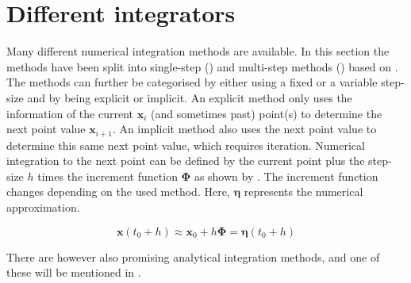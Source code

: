 
\section{Different integrators}
\label{sec:difint}
Many different numerical integration methods are available. In this section the methods have been split into single-step () and multi-step methods () based on \cite{noomen2013int}. The methods can further be categorised by either using a fixed or a variable step-size and by being explicit or implicit. An explicit method only uses the information of the current $\mathbf{x}_{i}$ (and sometimes past) point(s) to determine the next point value $\mathbf{x}_{i+1}$. An implicit method also uses the next point value to determine this same next point value, which requires iteration. Numerical integration to the next point can be defined by the current point plus the step-size $h$ times the increment function 
$\mathbf{\Phi}$ as shown by . The increment function changes depending on the used method. Here, $\mathbf{\eta}$ represents the numerical approximation. 



\begin{equation} \label{eq:integration}
\mathbf{x}(t_{0}+h)\approx\mathbf{x}_{0}+h\bm{\Phi}=\mathbf{\eta}(t_{0}+h)
\end{equation}


There are however also promising analytical integration methods, and one of these will be mentioned in .


